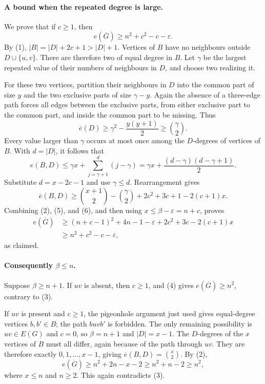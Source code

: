 \paragraph{A bound when the repeated degree is large.}
We prove that if \(c\geq1\), then
\[
 e(\overline G)\geq n^2+c^2-c-\varepsilon.
\tag{4}
\]
By (1), \(|B|=|D|+2c+1>|D|+1\). Vertices of \(B\) have no neighbours outside \(D\cup\{u,v\}\). There are therefore two of equal degree in \(B\). Let \(\gamma\) be the largest repeated value of their numbers of neighbours in \(D\), and choose two realizing it.

For these two vertices, partition their neighbours in \(D\) into the common part of size \(y\) and the two exclusive parts of size \(\gamma-y\). Again the absence of a three-edge path forces all edges between the exclusive parts, from either exclusive part to the common part, and inside the common part to be missing. Thus
\[
 \overline e(D)\geq\gamma^2-\frac{y(y+1)}2
 \geq\binom\gamma2.
\tag{5}
\]
Every value larger than \(\gamma\) occurs at most once among the \(D\)-degrees of vertices of \(B\). With \(d=|D|\), it follows that
\[
 e(B,D)\leq\gamma x+\sum_{j=\gamma+1}^{d}(j-\gamma)
 =\gamma x+\frac{(d-\gamma)(d-\gamma+1)}2.
\]
Substitute \(d=x-2c-1\) and use \(\gamma\leq d\). Rearrangement gives
\[
 \overline e(B,D)\geq
 \binom{x+1}{2}-\binom\gamma2
 +2c^2+3c+1-2(c+1)x.
\tag{6}
\]
Combining (2), (5), and (6), and then using \(x\leq\beta-\varepsilon=n+c\), proves
\[
 \begin{split}
 e(\overline G)&\geq
 (n+c-1)^2+4n-1-\varepsilon
       +2c^2+3c-2(c+1)x\\
 &\geq n^2+c^2-c-\varepsilon,
 \end{split}
\]
as claimed.

\paragraph{Consequently \(\beta\leq n\).}
Suppose \(\beta\geq n+1\). If \(uv\) is absent, then \(c\geq1\), and (4) gives \(e(\overline G)\geq n^2\), contrary to (3).

If \(uv\) is present and \(c\geq1\), the pigeonhole argument just used gives equal-degree vertices \(b,b'\in B\); the path \(buvb'\) is forbidden. The only remaining possibility is \(uv\in E(G)\) and \(c=0\), so \(\beta=n+1\) and \(|D|=x-1\). The \(D\)-degrees of the \(x\) vertices of \(B\) must all differ, again because of the path through \(uv\). They are therefore exactly \(0,1,\ldots,x-1\), giving \(\overline e(B,D)=\binom x2\). By (2),
\[
 e(\overline G)\geq n^2+2n-x-2
 \geq n^2+n-2\geq n^2,
\]
where \(x\leq n\) and \(n\geq2\). This again contradicts (3).

